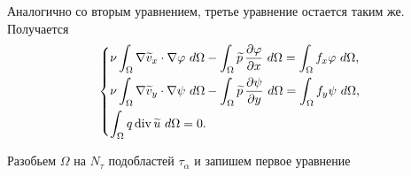 \documentclass[a4paper,14pt]{extarticle}
\begin{document}
	Аналогично со вторым уравнением, третье уравнение остается таким же. Получается
	\begin{equation}
	\begin{dcases}
		\nu\int_\Omega
		\nabla\widetilde v_x\cdot\nabla\varphi ~ d\Omega
		-
		\int_\Omega
		\widetilde p\,\frac{\partial\varphi}{\partial x} ~ d\Omega
		=
		\int_\Omega f_x\varphi ~ d\Omega, \\
			\nu\int_\Omega
		\nabla\widetilde v_y\cdot\nabla\psi ~ d\Omega
		-
		\int_\Omega
		\widetilde p\,\frac{\partial\psi}{\partial y} ~ d\Omega
		=
		\int_\Omega f_y\psi ~ d\Omega, \\
		\int_\Omega q\operatorname{div}\widetilde u ~ d\Omega = 0.
	\end{dcases}
	\end{equation}
	
	Разобьем $\Omega$ на $N_{\tau}$ подобластей $\tau_{\alpha}$ и запишем первое уравнение
	
\end{document}
